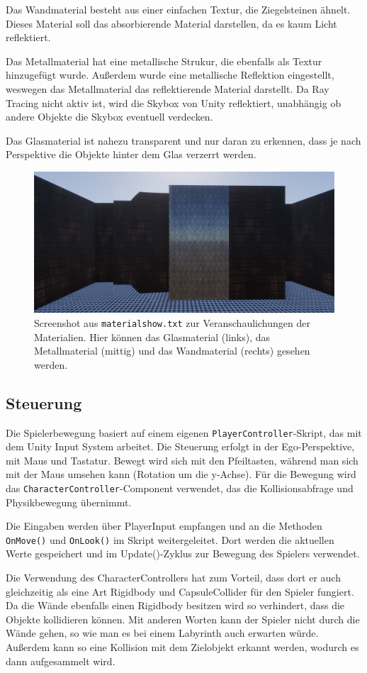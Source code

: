 \documentclass[a4paper]{article}
\begin{document}
Das Wandmaterial besteht aus einer einfachen Textur, die Ziegelsteinen ähnelt. Dieses Material soll das absorbierende Material darstellen, da es kaum Licht reflektiert.

Das Metallmaterial hat eine metallische Strukur, die ebenfalls als Textur hinzugefügt wurde. Außerdem wurde eine metallische Reflektion eingestellt, weswegen das Metallmaterial das reflektierende Material darstellt. Da Ray Tracing nicht aktiv ist, wird die Skybox von Unity reflektiert, unabhängig ob andere Objekte die Skybox eventuell verdecken.

Das Glasmaterial ist nahezu transparent und nur daran zu erkennen, dass je nach Perspektive die Objekte hinter dem Glas verzerrt werden.

\begin{figure}[h]
	\centering
	\includegraphics[width=0.5\linewidth]{img/Materialien.png}
	\caption{Screenshot aus \texttt{materialshow.txt} zur Veranschaulichungen der Materialien. Hier können das Glasmaterial (links), das Metallmaterial (mittig) und das Wandmaterial (rechts) gesehen werden.}
	\label{fig:materialien}
\end{figure}



\subsection{Steuerung}
Die Spielerbewegung basiert auf einem eigenen \texttt{PlayerController}-Skript, das mit dem Unity Input System arbeitet. Die Steuerung erfolgt in der Ego-Perspektive, mit Maus und Tastatur. Bewegt wird sich mit den Pfeiltasten, während man sich mit der Maus umsehen kann (Rotation um die y-Achse). Für die Bewegung wird das \texttt{CharacterController}-Component verwendet, das die Kollisionsabfrage und Physikbewegung übernimmt.

Die Eingaben werden über PlayerInput empfangen und an die Methoden \texttt{OnMove()} und \texttt{OnLook()} im Skript weitergeleitet. Dort werden die aktuellen Werte gespeichert und im Update()-Zyklus zur Bewegung des Spielers verwendet. 

Die Verwendung des CharacterControllers hat zum Vorteil, dass dort er auch gleichzeitig als eine Art Rigidbody und CapsuleCollider für den Spieler fungiert. Da die Wände ebenfalls einen Rigidbody besitzen wird so verhindert, dass die Objekte kollidieren können. Mit anderen Worten kann der Spieler nicht durch die Wände gehen, so wie man es bei einem Labyrinth auch erwarten würde. Außerdem kann so eine Kollision mit dem Zielobjekt erkannt werden, wodurch es dann aufgesammelt wird.
\end{document}
